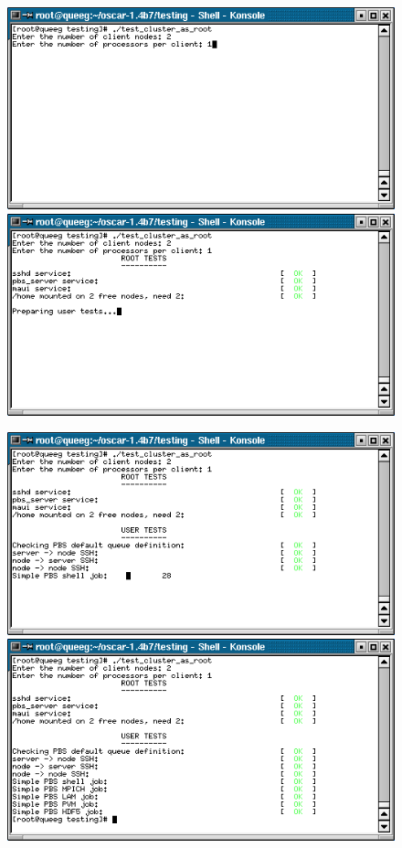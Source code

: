 \begin{figure}[h!]
  \begin{center}
    \centerline{
      \includegraphics[scale=\imgscale]{figs/8_sbs-test-cluster-prompt}
      \hspace{\imghskip}
      \includegraphics[scale=\imgscale]{figs/8_sbs-test-cluster-root-tests}
      }
    \vspace{\imgvskip}
    \centerline{
      \includegraphics[scale=\imgscale]{figs/8_sbs-test-cluster-user-tests}
      \hspace{\imghskip}
      \includegraphics[scale=\imgscale]{figs/8_test-cluster-complete}
}
\end{center}
\end{figure}
